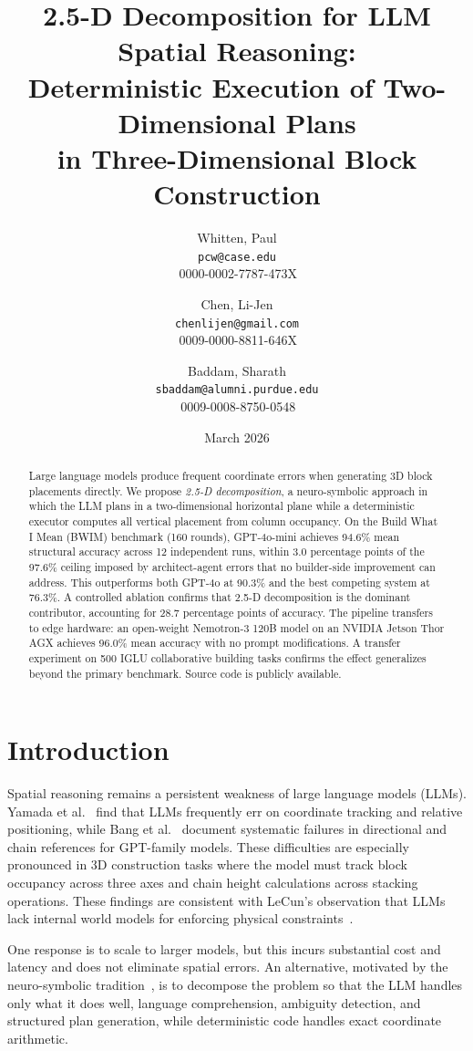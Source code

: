 \documentclass{article}
\title{2.5-D Decomposition for LLM Spatial Reasoning:\\Deterministic Execution of Two-Dimensional Plans\\in Three-Dimensional Block Construction}
\author{
    Whitten, Paul\\
  \texttt{pcw@case.edu}\\
  \orcidlink{0000-0002-7787-473X}\,0000-0002-7787-473X
  \and
  Chen, Li-Jen\\
  \texttt{chenlijen@gmail.com}\\
  \orcidlink{0009-0000-8811-646X}\,0009-0000-8811-646X
  \and
  Baddam, Sharath\\
  \texttt{sbaddam@alumni.purdue.edu}\\
  \orcidlink{0009-0008-8750-0548}\,0009-0008-8750-0548
}
\date{March 2026}
\begin{document}
\maketitle

\begin{abstract}
Large language models produce frequent coordinate errors when generating
3D block placements directly. We propose \emph{2.5-D decomposition}, a
neuro-symbolic approach in which the LLM plans in a two-dimensional
horizontal plane while a deterministic executor computes all vertical
placement from column occupancy. On the Build What I Mean (BWIM)
benchmark (160 rounds), GPT-4o-mini achieves 94.6\% mean structural
accuracy across 12 independent runs, within 3.0 percentage points of the
97.6\% ceiling imposed by architect-agent errors that no builder-side
improvement can address. This outperforms both GPT-4o at 90.3\%
and the best competing system at 76.3\%. A controlled
ablation confirms that 2.5-D decomposition is the dominant contributor,
accounting for 28.7 percentage points of accuracy. The pipeline transfers
to edge hardware: an open-weight Nemotron-3 120B model on an NVIDIA
Jetson Thor AGX achieves 96.0\% mean accuracy with no prompt
modifications. A transfer experiment on 500 IGLU collaborative building
tasks confirms the effect generalizes beyond the primary benchmark.
Source code is publicly available.
\end{abstract}

\section{Introduction}

Spatial reasoning remains a persistent weakness of large language models
(LLMs). Yamada et al.~\cite{yamada2024} find that LLMs frequently err on
coordinate tracking and relative positioning, while Bang et
al.~\cite{bang2023} document systematic failures in directional and chain
references for GPT-family models. These difficulties are especially
pronounced in 3D construction tasks where the model must track block
occupancy across three axes and chain height calculations across stacking
operations. These findings are consistent with LeCun's observation that
LLMs lack internal world models for enforcing physical
constraints~\cite{lecun2022}.

One response is to scale to larger models, but this incurs substantial cost
and latency and does not eliminate spatial errors. An alternative, motivated
by the neuro-symbolic tradition~\cite{yi2018}, is to decompose the problem
so that the LLM handles only what it does well, language comprehension,
ambiguity detection, and structured plan generation, while deterministic code
handles exact coordinate arithmetic.
\end{document}
